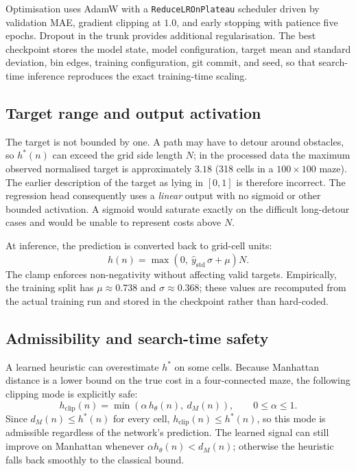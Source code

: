 \documentclass[11pt]{article}
\begin{document}
Optimisation uses AdamW with a \texttt{ReduceLROnPlateau} scheduler driven by
validation MAE, gradient clipping at $1.0$, and early stopping with patience
five epochs. Dropout in the trunk provides additional regularisation. The best
checkpoint stores the model state, model configuration, target mean and
standard deviation, bin edges, training configuration, git commit, and seed, so
that search-time inference reproduces the exact training-time scaling.

\subsection{Target range and output activation}
The target is not bounded by one. A path may have to detour around obstacles,
so $h^\ast(n)$ can exceed the grid side length $N$; in the processed data the
maximum observed normalised target is approximately $3.18$ (318 cells in a
$100\times100$ maze). The earlier description of the target as lying in
$[0,1]$ is therefore incorrect. The regression head consequently uses a
\emph{linear} output with no sigmoid or other bounded activation. A sigmoid
would saturate exactly on the difficult long-detour cases and would be unable
to represent costs above $N$.

At inference, the prediction is converted back to grid-cell units:
\begin{equation}
  \hat{h}(n) = \max\!\left(0,\ \hat{y}_{\text{std}}\,\sigma + \mu\right) N.
\end{equation}
The clamp enforces non-negativity without affecting valid targets. Empirically,
the training split has $\mu\approx0.738$ and $\sigma\approx0.368$; these values
are recomputed from the actual training run and stored in the checkpoint rather
than hard-coded.

\subsection{Admissibility and search-time safety}
A learned heuristic can overestimate $h^\ast$ on some cells. Because Manhattan
distance is a lower bound on the true cost in a four-connected maze, the
following clipping mode is explicitly safe:
\begin{equation}
  h_{\text{clip}}(n) = \min\!\left(\alpha\,h_\theta(n),\ d_M(n)\right),
  \qquad 0 \le \alpha \le 1.
\end{equation}
Since $d_M(n)\le h^\ast(n)$ for every cell, $h_{\text{clip}}(n)\le h^\ast(n)$,
so this mode is admissible regardless of the network's prediction. The learned
signal can still improve on Manhattan whenever $\alpha h_\theta(n)<d_M(n)$;
otherwise the heuristic falls back smoothly to the classical bound.
\end{document}
